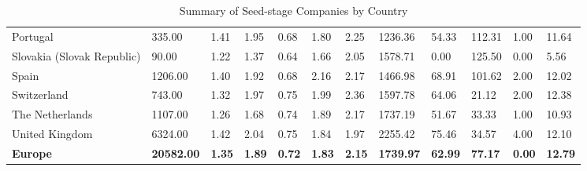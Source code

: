 \begin{table}[ht]
\begin{tabular}{llllllllllll}
  Portugal & 335.00 & 1.41 & 1.95 & 0.68 & 1.80 & 2.25 & 1236.36 & 54.33 & 112.31 & 1.00 & 11.64 \\ 
  Slovakia (Slovak Republic) & 90.00 & 1.22 & 1.37 & 0.64 & 1.66 & 2.05 & 1578.71 & 0.00 & 125.50 & 0.00 & 5.56 \\ 
  Spain & 1206.00 & 1.40 & 1.92 & 0.68 & 2.16 & 2.17 & 1466.98 & 68.91 & 101.62 & 2.00 & 12.02 \\ 
  Switzerland & 743.00 & 1.32 & 1.97 & 0.75 & 1.99 & 2.36 & 1597.78 & 64.06 & 21.12 & 2.00 & 12.38 \\ 
  The Netherlands & 1107.00 & 1.26 & 1.68 & 0.74 & 1.89 & 2.17 & 1737.19 & 51.67 & 33.33 & 1.00 & 10.93 \\ 
  United Kingdom & 6324.00 & 1.42 & 2.04 & 0.75 & 1.84 & 1.97 & 2255.42 & 75.46 & 34.57 & 4.00 & 12.10 \\ 
  \textbf{Europe} & \textbf{20582.00} & \textbf{1.35} & \textbf{1.89} & \textbf{0.72} & \textbf{1.83} & \textbf{2.15} & \textbf{1739.97} & \textbf{62.99} & \textbf{77.17} & \textbf{0.00} & \textbf{12.79} \\ 
   \bottomrule
\end{tabular}
\caption{Summary of Seed-stage Companies by Country} 
\label{tab:seed_summary_clean}
\end{table}
